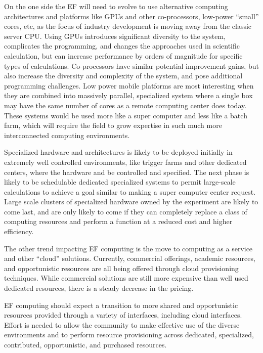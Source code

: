 On the one side the EF will need to evolve to use alternative computing
architectures and platforms like GPUs and other co-processors,  low-power
``small'' cores, etc, as the focus of industry development is moving away from
the classic server CPU.  Using GPUs introduces significant diversity to the
system, complicates the programming, and changes the approaches used in
scientific calculation, but can increase performance by orders of magnitude
for specific types of calculations.  Co-processors have similar potential
improvement gains, but also increase the diversity and complexity of the
system, and pose additional programming challenges.  Low power mobile
platforms are most interesting when they are combined into massively parallel,
specialized system where a single box may have the same number of cores as a
remote computing center does today.  These systems would be used more like a
super computer and less like a batch farm, which will require the field to
grow expertise in such much more interconnected computing environments.

Specialized hardware and architectures is likely to be deployed initially in
extremely well controlled environments, like trigger farms and other dedicated
centers, where the hardware and be controlled and specified. The next phase is
likely to be schedulable dedicated specialized systems to permit large-scale
calculations to achieve a goal similar to making a super computer center
request.  Large scale clusters of specialized hardware owned by the experiment
are likely to come last, and are only likely to come if they can completely
replace a class of computing resources and perform a function at a reduced
cost and higher efficiency.

The other trend impacting EF computing is the move to computing as a service
and other ``cloud'' solutions.  Currently,  commercial offerings, academic
resources, and opportunistic resources are all being offered through cloud
provisioning techniques.  While commercial solutions are still more expensive
than well used dedicated resources, there is a steady decrease in the pricing.

EF computing should expect a transition to more shared and opportunistic
resources provided through a variety of interfaces, including cloud
interfaces.   Effort is needed to allow the community to make effective use of
the diverse environments and to perform resource provisioning across
dedicated, specialized, contributed, opportunistic, and purchased resources.

